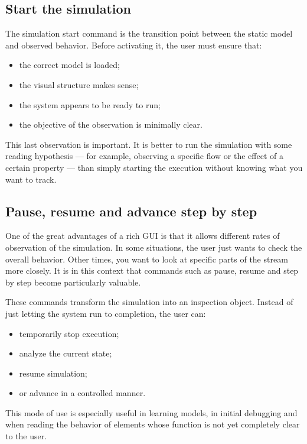 \subsection{Start the simulation}
\label{subsec:cap5_iniciar_simulacao}

The simulation start command is the transition point between the static model and observed behavior. Before activating it, the user must ensure that:
\begin{itemize}
\item the correct model is loaded;
\item the visual structure makes sense;
\item the system appears to be ready to run;
\item the objective of the observation is minimally clear.
\end{itemize}

This last observation is important. It is better to run the simulation with some reading hypothesis — for example, observing a specific flow or the effect of a certain property — than simply starting the execution without knowing what you want to track.

\subsection{Pause, resume and advance step by step}
\label{subsec:cap5_pausar_retormar_passo_a_passo}

One of the great advantages of a rich GUI is that it allows different rates of observation of the simulation. In some situations, the user just wants to check the overall behavior. Other times, you want to look at specific parts of the stream more closely. It is in this context that commands such as pause, resume and step by step become particularly valuable.

These commands transform the simulation into an inspection object. Instead of just letting the system run to completion, the user can:
\begin{itemize}
\item temporarily stop execution;
\item analyze the current state;
\item resume simulation;
\item or advance in a controlled manner.
\end{itemize}

This mode of use is especially useful in learning models, in initial debugging and when reading the behavior of elements whose function is not yet completely clear to the user.

